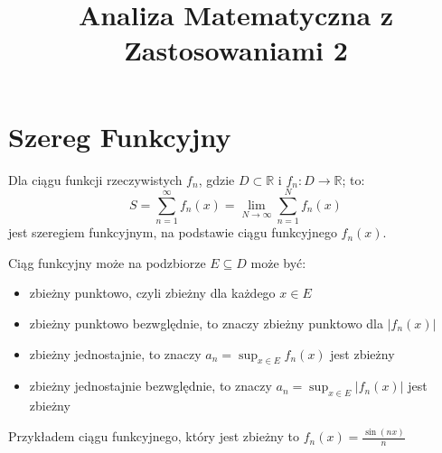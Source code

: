 \documentclass{../notatki}
\title{Analiza Matematyczna z Zastosowaniami 2}
\begin{document}
\section{Szereg Funkcyjny}

Dla ciągu funkcji rzeczywistych $f_n$, gdzie $D \subset \mathbb{R}$ i
$f_n: D \to \mathbb{R}$; to:
$$
S = \sum_{n=1}^{\infty} f_n(x) = \lim_{N \to \infty} \sum_{n=1}^{N} f_n(x)
$$
jest szeregiem funkcyjnym, na podstawie ciągu funkcyjnego $f_n(x)$.

Ciąg funkcyjny może na podzbiorze $E \subseteq D$ może być:
\begin{itemize}
  \item zbieżny punktowo, czyli zbieżny dla każdego $x \in E$
  \item zbieżny punktowo bezwględnie, to znaczy zbieżny punktowo dla $|f_n(x)|$
  \item zbieżny jednostajnie, to znaczy $a_n = \sup_{x \in E} f_n(x)$
    jest zbieżny
  \item zbieżny jednostajnie bezwględnie, to znaczy $a_n = \sup_{x
    \in E} |f_n(x)|$ jest zbieżny
\end{itemize}

Przykładem ciągu funkcyjnego, który jest zbieżny to $f_n(x) =
\frac{\sin(nx)}{n}$
\end{document}
